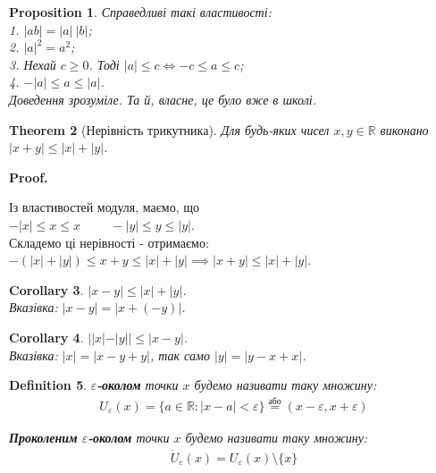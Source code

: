 \documentclass[a4paper, 14pt]{article}
\makeatletter
\def\qed{$\blacksquare$}
\theoremstyle{theoremdd}
\newtheorem{theorem}{Theorem}[subsection]
\theoremstyle{theoremdd}
\newtheorem{definition}[theorem]{Definition}
\theoremstyle{theoremdd}
\theoremstyle{theoremdd}
\theoremstyle{theoremdd}
\newtheorem{proposition}[theorem]{Proposition}
\theoremstyle{theoremdd}
\theoremstyle{theoremdd}
\theoremstyle{theoremdd}
\newtheorem{corollary}[theorem]{Corollary}
\renewenvironment{proof}[1][Proof.\\]{\par
\pushQED{\hfill \qed}%
\normalfont \topsep6\p@\@plus6\p@\relax
\trivlist
\item\relax
{\bfseries
#1\@addpunct{.}}\hspace\labelsep\ignorespaces
}{%
\popQED\endtrivlist\@endpefalse
}
\makeatother
\begin{document}
	\begin{proposition}
	Справедливі такі властивості:\\
	1. $|ab| = |a| \ |b|$;\\
	2. $|a|^2 = a^2$;\\
	3. Нехай $c \geq 0$. Тоді $|a| \leq c \iff -c \leq a \leq c$;\\
	4. $-|a| \leq a \leq |a|$.\\
	\textit{Доведення зрозуміле. Та й, власне, це було вже в школі.}
	\end{proposition}

	\begin{theorem}[Нерівність трикутника]
	Для будь-яких чисел $x,y \in \mathbb{R}$ виконано $|x+y| \leq |x| + |y|$.
	\end{theorem}
	
	\begin{proof}
	Із властивостей модуля, маємо, що\\
	$-|x| \leq x \leq x \hspace{1cm} -|y| \leq y \leq |y|$.\\
	Складемо ці нерівності - отримаємо:\\
	$-(|x|+|y|) \leq x+y \leq |x|+|y| \implies |x+y| \leq |x| + |y|$.
	\end{proof}
	
	\begin{corollary}
	$|x-y| \leq |x| + |y|$.\\
	\textit{Вказівка: $|x-y| = |x+(-y)|$.}
	\end{corollary}
	
	\begin{corollary}
	$||x|-|y|| \leq |x-y|$.\\
	\textit{Вказівка: $|x| = |x-y+y|$, так само $|y| = |y-x+x|$.}
	\end{corollary}
	
	\begin{definition}
	$\varepsilon$\textbf{-околом} точки $x$ будемо називати таку множину:
	\begin{align*}
	U_{\varepsilon}(x) = \{a \in \mathbb{R}: |x-a| < \varepsilon \} \overset{\text{або}}{=} (x-\varepsilon,x+\varepsilon)
	\end{align*}
	\begin{figure}[H]
	\centering
	\end{figure}
\textbf{Проколеним} $\varepsilon$\textbf{-околом} точки $x$ будемо називати таку множину:
	\begin{align*}
	\mathring{U}_{\varepsilon}(x) = U_{\varepsilon}(x) \setminus \{x\}
	\end{align*}
	\end{definition}
	
\end{document}
